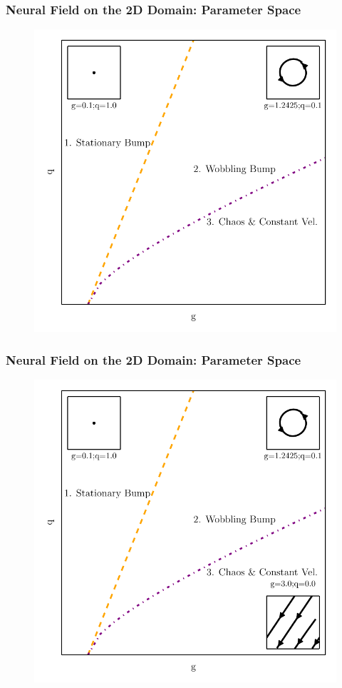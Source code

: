 \documentclass{beamer}
\begin{document}
\begin{frame}
\frametitle{Neural Field on the 2D Domain: Parameter Space}
\begin{figure}
 \includegraphics[width=.6\textwidth]{twod_full_auto_5terms_2par2.pdf}
\end{figure}
\end{frame}

\begin{frame}
\frametitle{Neural Field on the 2D Domain: Parameter Space}
\begin{figure}
 \includegraphics[width=.6\textwidth]{twod_full_auto_5terms_2par3.pdf}
\end{figure}
\end{frame}
\end{document}
